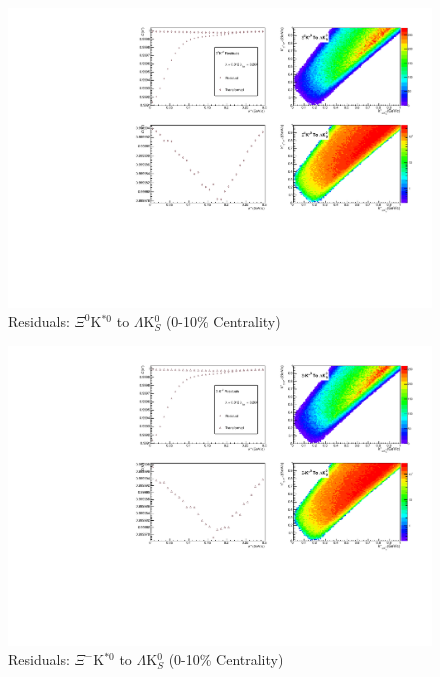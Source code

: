 \documentclass[../AnalysisNoteJBuxton.tex]{subfiles}
\begin{document}
\begin{figure}[h]
  \centering
  \includegraphics[width=\textwidth]{9_AdditionalFigures/Figures/Residuals/LamK0/Residuals_LamK0_0010_Xi0KSt0ToLamK0_MomResCrctn_NonFlatBgdCrctn_SingleLamParam_ResidualsIncluded_UsingCoulombOnlyInterpCfs.pdf}
  \caption[Residuals: $\Xi^{0}$K$^{*0}$ to $\Lambda$K$^{0}_{S}$ (0-10\% Centrality)]{Residuals: $\Xi^{0}$K$^{*0}$ to $\Lambda$K$^{0}_{S}$ (0-10\% Centrality)}
  \label{fig:Res_LamK0_0010_Xi0KSt0}
\end{figure}

\begin{figure}[h]
  \centering
  \includegraphics[width=\textwidth]{9_AdditionalFigures/Figures/Residuals/LamK0/Residuals_LamK0_0010_XiKSt0ToLamK0_MomResCrctn_NonFlatBgdCrctn_SingleLamParam_ResidualsIncluded_UsingCoulombOnlyInterpCfs.pdf}
  \caption[Residuals: $\Xi^{-}$K$^{*0}$ to $\Lambda$K$^{0}_{S}$ (0-10\% Centrality)]{Residuals: $\Xi^{-}$K$^{*0}$ to $\Lambda$K$^{0}_{S}$ (0-10\% Centrality)}
  \label{fig:Res_LamK0_0010_XiCKSt0}
\end{figure}
\end{document}

